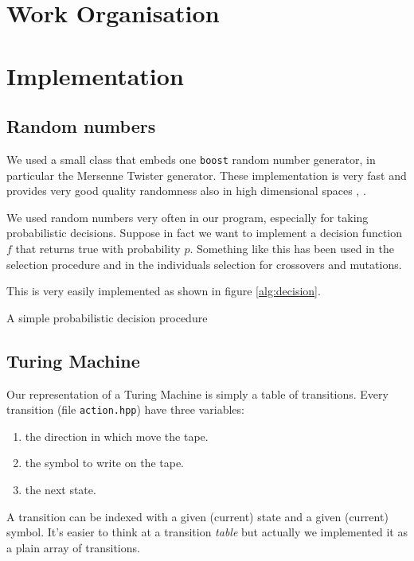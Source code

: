 \documentclass{report}
\begin{document}
\chapter{Work Organisation}
\label{chap:wo}

\chapter{Implementation}
\label{chap:impl}

\section{Random numbers}
\label{sec:random}
We used a small class that embeds one \texttt{boost} random number generator, in particular the Mersenne Twister generator. These implementation is very fast and provides very good quality randomness also in high dimensional spaces \cite{boost-random}, \cite{mersenne-twister}.

We used random numbers very often in our program, especially for taking probabilistic decisions. Suppose in fact we want to implement a decision function $f$ that returns true with probability $p$. Something like this has been used in the selection procedure and in the individuals selection for crossovers and mutations.

This is very easily implemented as shown in figure \ref{alg:decision}.

\begin{algorithm}[t]
\caption[Probabilistic decision]{A simple probabilistic decision procedure}
\label{alg:decision}

\end{algorithm}

\section{Turing Machine}
Our representation of a Turing Machine is simply a table of transitions. Every transition (file \texttt{action.hpp}) have three variables:
\begin{enumerate}
\item the direction in which move the tape.
\item the symbol to write on the tape.
\item the next state.
\end{enumerate}
A transition can be indexed with a given (current) state and a given (current) symbol. It's easier to think at a transition \textit{table} but actually we implemented it as a plain array of transitions.
\end{document}
